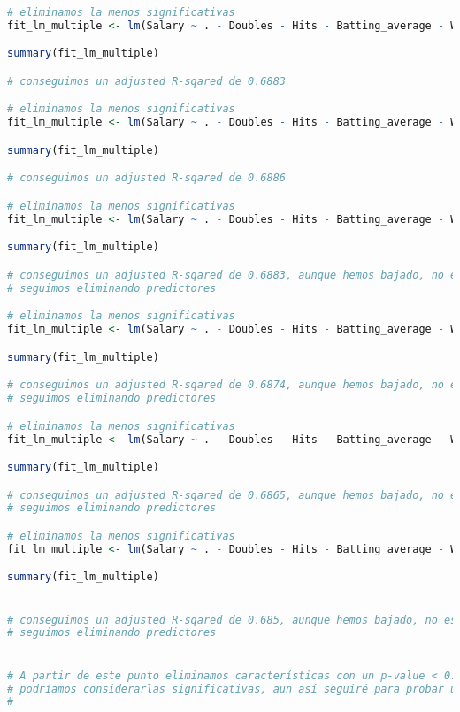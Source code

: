 \begin{lstlisting}[language=R]
# eliminamos la menos significativas
fit_lm_multiple <- lm(Salary ~ . - Doubles - Hits - Batting_average - Walks, data = baseball)

summary(fit_lm_multiple)

# conseguimos un adjusted R-sqared de 0.6883

# eliminamos la menos significativas
fit_lm_multiple <- lm(Salary ~ . - Doubles - Hits - Batting_average - Walks - `On-base_percentage`, data = baseball)

summary(fit_lm_multiple)

# conseguimos un adjusted R-sqared de 0.6886

# eliminamos la menos significativas
fit_lm_multiple <- lm(Salary ~ . - Doubles - Hits - Batting_average - Walks - `On-base_percentage` - Triples, data = baseball)

summary(fit_lm_multiple)

# conseguimos un adjusted R-sqared de 0.6883, aunque hemos bajado, no es nada significativo
# seguimos eliminando predictores

# eliminamos la menos significativas
fit_lm_multiple <- lm(Salary ~ . - Doubles - Hits - Batting_average - Walks - `On-base_percentage` - Triples - Arbitration, data = baseball)

summary(fit_lm_multiple)

# conseguimos un adjusted R-sqared de 0.6874, aunque hemos bajado, no es nada significativo
# seguimos eliminando predictores

# eliminamos la menos significativas
fit_lm_multiple <- lm(Salary ~ . - Doubles - Hits - Batting_average - Walks - `On-base_percentage` - Triples - Arbitration - Errors, data = baseball)

summary(fit_lm_multiple)

# conseguimos un adjusted R-sqared de 0.6865, aunque hemos bajado, no es nada significativo
# seguimos eliminando predictores

# eliminamos la menos significativas
fit_lm_multiple <- lm(Salary ~ . - Doubles - Hits - Batting_average - Walks - `On-base_percentage` - Triples - Arbitration - Errors - Runs, data = baseball)

summary(fit_lm_multiple)


# conseguimos un adjusted R-sqared de 0.685, aunque hemos bajado, no es nada significativo
# seguimos eliminando predictores


# A partir de este punto eliminamos características con un p-value < 0.05, por lo que
# podríamos considerarlas significativas, aun así seguiré para probar un modelo simple
#


\end{lstlisting}
